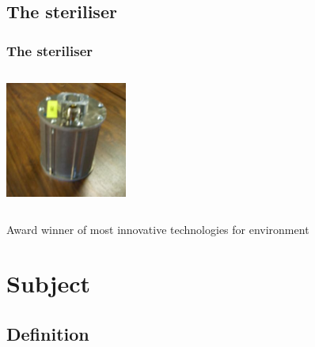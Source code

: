 \documentclass[xcolor=dvipsnames,10pt]{beamer}
\begin{document}
  \subsection{The steriliser}

  \begin{frame}
          \frametitle{The steriliser}
  \includegraphics[height=4.5cm, width=4cm]{images/steriliser.jpg}
\hspace{0.5cm}
\begin{minipage}{0.5\linewidth}
 Award winner of most innovative technologies for environment
\end{minipage}
  

  \end{frame}

  \section{Subject}

  \subsection{Definition}
\end{document}
